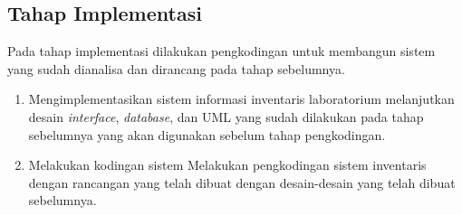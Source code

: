 \subsection{Tahap Implementasi}
Pada tahap implementasi dilakukan pengkodingan untuk membangun sistem yang sudah dianalisa dan dirancang pada tahap sebelumnya.
\begin{enumerate}
  \item Mengimplementasikan sistem informasi inventaris laboratorium melanjutkan desain \textit{interface}, \textit{database}, dan UML yang sudah dilakukan pada tahap sebelumnya yang akan digunakan sebelum tahap pengkodingan.
  \item Melakukan kodingan sistem
        Melakukan pengkodingan sistem inventaris dengan rancangan yang telah dibuat dengan desain-desain yang telah dibuat sebelumnya.
\end{enumerate}
